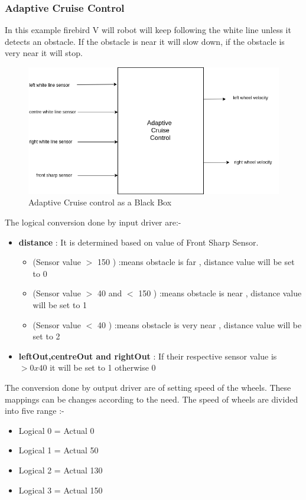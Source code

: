 \documentclass[16pt]{report}
\begin{document}
\subsubsection{Adaptive Cruise Control}

In this example firebird V will robot will keep  following the white line unless it detects an obstacle. If the obstacle is near it will slow down, if the obstacle is very near it will  stop.

\begin{figure}[H]
\includegraphics[width=\linewidth]{fig9.png}
\caption{Adaptive Cruise control as a Black Box}
\end{figure}

The logical conversion done by input driver are:-
\begin{itemize}
    \item \textbf{distance} : It is determined based on value of Front Sharp Sensor.
            \begin{itemize}
                \item (Sensor value $>$ 150 ) :means obstacle is far , distance value will be set to 0
                \item (Sensor value $>$ 40 and $<$ 150 ) :means obstacle is near , distance value will be set to 1
                \item (Sensor value $<$ 40 ) :means obstacle is very near , distance value will be set to 2
            \end{itemize}
            
    \item \textbf{leftOut,centreOut and rightOut} : If their respective sensor value is $>0x40$ it will be set to 1 otherwise 0
\end{itemize}

The conversion done by output driver are of setting speed of the wheels. These mappings can be changes according to the need. The speed of wheels are divided into five range :-
\begin{itemize}
    \item Logical 0 = Actual 0
    \item Logical 1 = Actual 50
    \item Logical 2 = Actual 130
    \item Logical 3 = Actual 150
\end{itemize}
\end{document}
